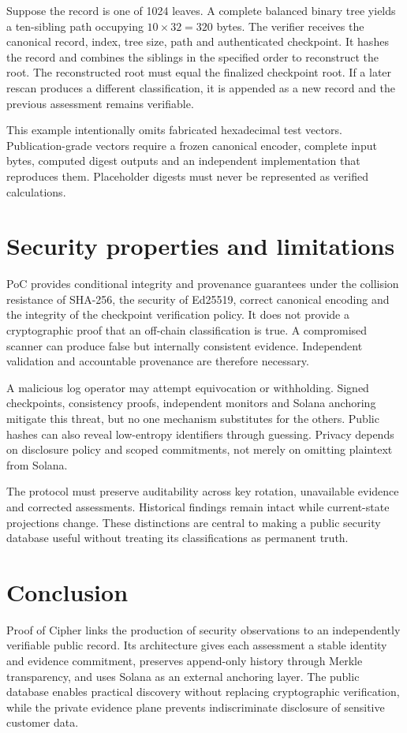 \documentclass[10pt,a4paper]{article}
\begin{document}
Suppose the record is one of 1024 leaves. A complete balanced binary tree yields a ten-sibling path occupying \(10\times32=320\) bytes. The verifier receives the canonical record, index, tree size, path and authenticated checkpoint. It hashes the record and combines the siblings in the specified order to reconstruct the root. The reconstructed root must equal the finalized checkpoint root. If a later rescan produces a different classification, it is appended as a new record and the previous assessment remains verifiable.


This example intentionally omits fabricated hexadecimal test vectors. Publication-grade vectors require a frozen canonical encoder, complete input bytes, computed digest outputs and an independent implementation that reproduces them. Placeholder digests must never be represented as verified calculations.


\section*{Security properties and limitations}
PoC provides conditional integrity and provenance guarantees under the collision resistance of SHA-256, the security of Ed25519, correct canonical encoding and the integrity of the checkpoint verification policy. It does not provide a cryptographic proof that an off-chain classification is true. A compromised scanner can produce false but internally consistent evidence. Independent validation and accountable provenance are therefore necessary.


A malicious log operator may attempt equivocation or withholding. Signed checkpoints, consistency proofs, independent monitors and Solana anchoring mitigate this threat, but no one mechanism substitutes for the others. Public hashes can also reveal low-entropy identifiers through guessing. Privacy depends on disclosure policy and scoped commitments, not merely on omitting plaintext from Solana.


The protocol must preserve auditability across key rotation, unavailable evidence and corrected assessments. Historical findings remain intact while current-state projections change. These distinctions are central to making a public security database useful without treating its classifications as permanent truth.


\section*{Conclusion}
Proof of Cipher links the production of security observations to an independently verifiable public record. Its architecture gives each assessment a stable identity and evidence commitment, preserves append-only history through Merkle transparency, and uses Solana as an external anchoring layer. The public database enables practical discovery without replacing cryptographic verification, while the private evidence plane prevents indiscriminate disclosure of sensitive customer data.
\end{document}
